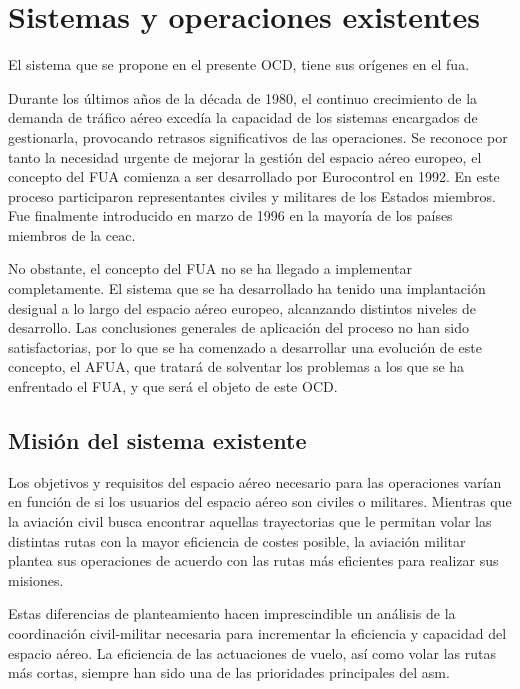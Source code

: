 \chapter{Sistemas y operaciones existentes}

El sistema que se propone en el presente OCD, tiene sus orígenes en el \acrfull{fua}.

Durante los últimos años de la década de 1980, el continuo crecimiento de la demanda de tráfico aéreo excedía la capacidad de los sistemas encargados de gestionarla, provocando retrasos significativos de las operaciones. Se reconoce por tanto la necesidad urgente de mejorar la gestión del espacio aéreo europeo, el concepto del FUA comienza a ser desarrollado por Eurocontrol en 1992. En este proceso participaron representantes civiles y militares de los Estados miembros. Fue finalmente introducido en marzo de 1996 en la mayoría de los países miembros de la \acrfull{ceac}.

No obstante, el concepto del FUA no se ha llegado a implementar completamente. El sistema que se ha desarrollado ha tenido una implantación desigual a lo largo del espacio aéreo europeo, alcanzando distintos niveles de desarrollo. Las conclusiones generales de aplicación del proceso no han sido satisfactorias, por lo que se ha comenzado a desarrollar una evolución de este concepto, el AFUA, que tratará de solventar los problemas a los que se ha enfrentado el FUA, y que será el objeto de este OCD.

\section{Misión del sistema existente}

Los objetivos y requisitos del espacio aéreo necesario para las operaciones varían en función de si los usuarios del espacio aéreo son civiles o militares. Mientras que la aviación civil busca encontrar aquellas trayectorias que le permitan volar las distintas rutas con la mayor eficiencia de costes posible, la aviación militar plantea sus operaciones de acuerdo con las rutas más eficientes para realizar sus misiones. 

Estas diferencias de planteamiento hacen imprescindible un análisis de la coordinación civil-militar necesaria para incrementar la eficiencia y capacidad del espacio aéreo. La eficiencia de las actuaciones de vuelo, así como volar las rutas más cortas, siempre han sido una de las prioridades principales del \acrfull{asm}.

